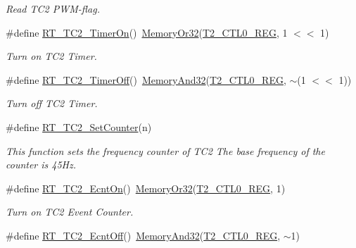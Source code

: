 \begin{DoxyCompactItemize}
\begin{DoxyCompactList}\small\item\em Read T\+C2 P\+W\+M-\/flag. \end{DoxyCompactList}\item 
\#define \mbox{\hyperlink{a00047_ab274ee44af2080d68745b2ec3af06648}{R\+T\+\_\+\+T\+C2\+\_\+\+Timer\+On}}()~\mbox{\hyperlink{a00020_a27874a97deab7cecdde5ddecf466e31e}{Memory\+Or32}}(\mbox{\hyperlink{a00020_adadaa0ab1ebbd7ba9b70dfd24c3ed44daf2e9deb36631241181cbf09e8d959475}{T2\+\_\+\+C\+T\+L0\+\_\+\+R\+EG}}, 1 $<$$<$ 1)
\begin{DoxyCompactList}\small\item\em Turn on T\+C2 Timer. \end{DoxyCompactList}\item 
\#define \mbox{\hyperlink{a00047_a4328299fe0323ef75508eadf9b937ba1}{R\+T\+\_\+\+T\+C2\+\_\+\+Timer\+Off}}()~\mbox{\hyperlink{a00020_ad87cedffcaadc51db22594fce55173d4}{Memory\+And32}}(\mbox{\hyperlink{a00020_adadaa0ab1ebbd7ba9b70dfd24c3ed44daf2e9deb36631241181cbf09e8d959475}{T2\+\_\+\+C\+T\+L0\+\_\+\+R\+EG}}, $\sim$(1 $<$$<$ 1))
\begin{DoxyCompactList}\small\item\em Turn off T\+C2 Timer. \end{DoxyCompactList}\item 
\#define \mbox{\hyperlink{a00047_a28ff54e7b5cd20e082ea21b6731d5b51}{R\+T\+\_\+\+T\+C2\+\_\+\+Set\+Counter}}(n)
\begin{DoxyCompactList}\small\item\em This function sets the frequency counter of T\+C2 The base frequency of the counter is 45\+Hz. \end{DoxyCompactList}\item 
\#define \mbox{\hyperlink{a00047_a261544e2cbdbdeee0d22734b29827cd2}{R\+T\+\_\+\+T\+C2\+\_\+\+Ecnt\+On}}()~\mbox{\hyperlink{a00020_a27874a97deab7cecdde5ddecf466e31e}{Memory\+Or32}}(\mbox{\hyperlink{a00020_adadaa0ab1ebbd7ba9b70dfd24c3ed44daf2e9deb36631241181cbf09e8d959475}{T2\+\_\+\+C\+T\+L0\+\_\+\+R\+EG}}, 1)
\begin{DoxyCompactList}\small\item\em Turn on T\+C2 Event Counter. \end{DoxyCompactList}\item 
\#define \mbox{\hyperlink{a00047_af77e205baae8e267fda5374c167ab76c}{R\+T\+\_\+\+T\+C2\+\_\+\+Ecnt\+Off}}()~\mbox{\hyperlink{a00020_ad87cedffcaadc51db22594fce55173d4}{Memory\+And32}}(\mbox{\hyperlink{a00020_adadaa0ab1ebbd7ba9b70dfd24c3ed44daf2e9deb36631241181cbf09e8d959475}{T2\+\_\+\+C\+T\+L0\+\_\+\+R\+EG}}, $\sim$1)

\end{DoxyCompactItemize}
